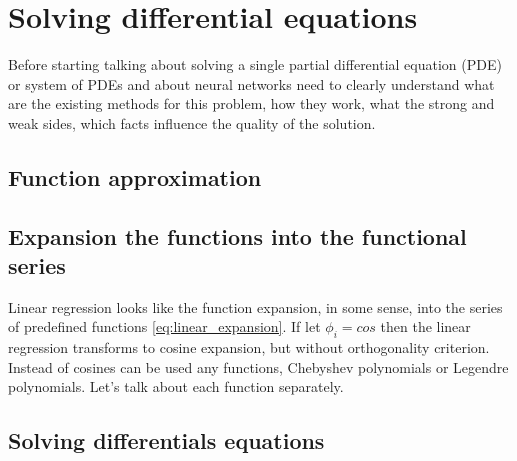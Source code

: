 \chapter{Solving differential equations}

Before starting talking about solving a single partial differential equation (PDE) or system of PDEs and about neural networks need to clearly understand what are the existing methods for this problem, how they work, what the strong and weak sides, which facts influence the quality of the solution. 

\section{Function approximation}




\newpage
\section{Expansion the functions into the functional series}
Linear regression looks like the function expansion, in some sense, into the series of predefined functions \eqref{eq:linear_expansion}. If let $\phi_i = cos$ then the linear regression transforms to cosine expansion, but without orthogonality criterion. Instead of cosines can be used any functions, Chebyshev polynomials or Legendre polynomials. 
Let's talk about each function separately.





\newpage
\section{Solving differentials equations}

